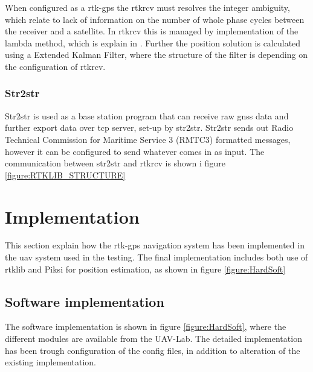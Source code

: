 When configured as a \gls{rtk-gps} the rtkrcv must resolves the integer ambiguity, which relate to lack of information on the number of whole phase cycles between the receiver and a satellite. In rtkrcv this is managed by implementation of the \gls{lambda} method, which is explain in \citep{LAMBDAMETHOD,Ambiguity:Estimation}.
Further the position solution is calculated using a Extended Kalman Filter, where the structure of the filter is depending on the configuration of rtkrcv.
\subsubsection{Str2str}
Str2str is used as a base station program that can receive raw \gls{gnss} data and further export data over tcp server, set-up by str2str. Str2str sends out Radio Technical Commission for Maritime Service 3 (RMTC3) formatted messages, however it can be configured to send whatever comes in as input. The communication between str2str and rtkrcv is shown i figure \ref{figure:RTKLIB_STRUCTURE}
\section{Implementation}
This section explain how the \gls{rtk-gps} navigation system has been implemented in the \gls{uav} system used in the testing. The final implementation includes both use of \gls{rtklib} and Piksi for position estimation, as shown in figure \ref{figure:HardSoft}


\subsection{Software implementation}
The software implementation is shown in figure \ref{figure:HardSoft}, where the different modules are available from the UAV-Lab. The detailed implementation has been trough configuration of the config files, in addition to alteration of the existing implementation.

